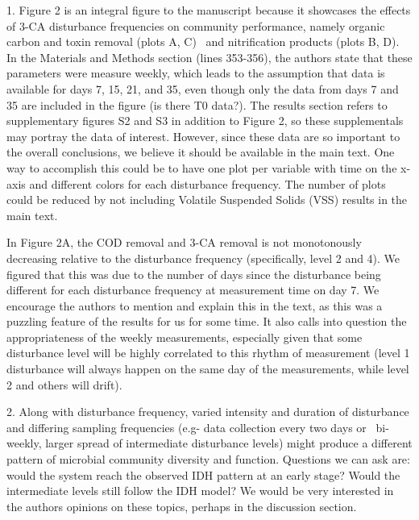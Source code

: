 \documentclass[10pt]{article}
\begin{document}
1. Figure 2 is an integral figure to the manuscript because it showcases
the effects of 3-CA disturbance frequencies on community performance,
namely organic carbon and toxin removal (plots A, C)~ and nitrification
products (plots B, D). In the Materials and Methods section (lines
353-356), the authors state that these parameters were measure weekly,
which leads to the assumption that data is available for days 7, 15, 21,
and 35, even though only the data from days 7 and 35 are included in the
figure (is there T0 data?). The results section refers to supplementary
figures S2 and S3 in addition to Figure 2, so these supplementals may
portray the data of interest. However, since these data are so important
to the overall conclusions, we believe it should be available in the
main text. One way to accomplish this could be to have one plot per
variable with time on the x-axis and different colors for each
disturbance frequency. The number of plots could be reduced by not
including Volatile Suspended Solids (VSS) results in the main text.~

\par\null

In Figure 2A, the COD removal and 3-CA removal is not monotonously
decreasing relative to the disturbance frequency (specifically, level 2
and 4). We figured that this was due to the number of days since the
disturbance being different for each disturbance frequency at
measurement time on day 7. We encourage the authors to mention and
explain this in the text, as this was a puzzling feature of the results
for us for some time. It also calls into question the appropriateness of
the weekly measurements, especially given that some disturbance level
will be highly correlated to this rhythm of measurement (level 1
disturbance will always happen on the same day of the measurements,
while level 2 and others will drift).~

\par\null

2. Along with disturbance frequency, varied intensity and duration of
disturbance and differing sampling frequencies (e.g- data collection
every two days or ~bi-weekly, larger spread of intermediate disturbance
levels) might produce a different pattern of microbial community
diversity and function. Questions we can ask are: would the system reach
the observed IDH pattern at an early stage? Would the intermediate
levels still follow the IDH model? We would be very interested in the
authors opinions on these topics, perhaps in the discussion section.~
\end{document}

